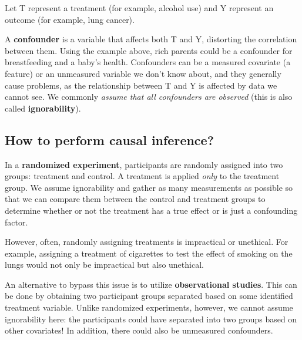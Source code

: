 \documentclass[
  letterpaper,
  DIV=11,
  numbers=noendperiod]{scrreprt}
\begin{document}
Let T represent a treatment (for example, alcohol use) and Y represent
an outcome (for example, lung cancer).

A \textbf{confounder} is a variable that affects both T and Y,
distorting the correlation between them. Using the example above, rich
parents could be a confounder for breastfeeding and a baby's health.
Confounders can be a measured covariate (a feature) or an unmeasured
variable we don't know about, and they generally cause problems, as the
relationship between T and Y is affected by data we cannot see. We
commonly \emph{assume that all confounders are observed} (this is also
called \textbf{ignorability}).

\subsection{How to perform causal
inference?}\label{how-to-perform-causal-inference}

In a \textbf{randomized experiment}, participants are randomly assigned
into two groups: treatment and control. A treatment is applied
\emph{only} to the treatment group. We assume ignorability and gather as
many measurements as possible so that we can compare them between the
control and treatment groups to determine whether or not the treatment
has a true effect or is just a confounding factor.

However, often, randomly assigning treatments is impractical or
unethical. For example, assigning a treatment of cigarettes to test the
effect of smoking on the lungs would not only be impractical but also
unethical.

An alternative to bypass this issue is to utilize \textbf{observational
studies}. This can be done by obtaining two participant groups separated
based on some identified treatment variable. Unlike randomized
experiments, however, we cannot assume ignorability here: the
participants could have separated into two groups based on other
covariates! In addition, there could also be unmeasured confounders.
\end{document}
